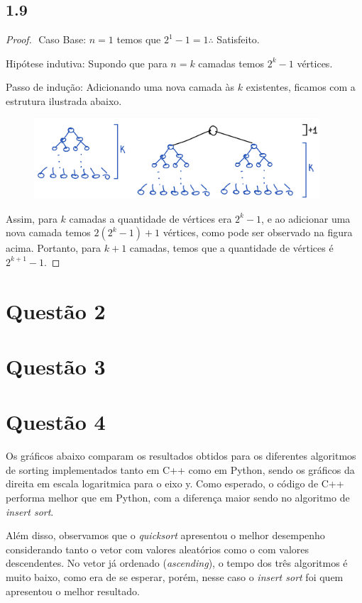 \documentclass{article}
\begin{document}
\subsection*{1.9}
\begin{proof}
$ $\newline
Caso Base: $n = 1$ temos que $2^1 - 1 = 1 \therefore$ Satisfeito.

Hipótese indutiva: Supondo que para $n = k$ camadas temos $2^k -1$ vértices.

Passo de indução: Adicionando uma nova camada às $k$ existentes, ficamos com a estrutura ilustrada abaixo.
  \begin{figure}[!h]
  \centering
  \includegraphics[height=3cm]{Q1_9.png}
  \end{figure}


Assim, para $k$ camadas a quantidade de vértices era $2^k -1$, e ao adicionar uma nova camada temos
$2(2^k - 1)+1$ vértices, como pode ser observado na figura acima. Portanto, para $k+1$ camadas, temos
que a quantidade de vértices é $2^{k+1} - 1$.

\end{proof}


\section*{Questão 2}
\section*{Questão 3}
\section*{Questão 4}

Os gráficos abaixo comparam os resultados obtidos para os diferentes algoritmos de sorting
implementados tanto em C++ como em Python, sendo os gráficos da direita em escala logaritmica para o eixo y.
Como esperado, o código de C++ performa melhor
que em Python, com a diferença maior sendo no algoritmo de {\it insert sort}.

Além disso, observamos que o {\it quicksort} apresentou o melhor
desempenho considerando tanto o vetor com valores aleatórios como o com
valores descendentes.
No vetor já ordenado ({\it ascending}), o tempo dos três algoritmos é muito baixo, como
era de se esperar, porém, nesse caso o {\it insert sort} foi quem apresentou o melhor
resultado.
\end{document}
